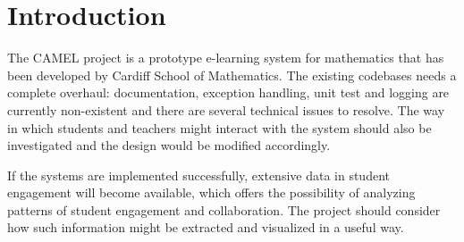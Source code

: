 \section{Introduction} %
The CAMEL project is a prototype e-learning system for mathematics that has been developed by Cardiff School of Mathematics. The existing codebases needs a complete overhaul: documentation, exception handling, unit test and logging are currently non-existent and there are several technical issues to resolve. The way in which students and teachers might interact with the system should also be investigated and the design would be modified accordingly. 

	If the systems are implemented successfully, extensive data in student engagement will become available, which offers the possibility of analyzing patterns of student engagement and collaboration. The project should consider how such information might be extracted and visualized in a useful way. 

